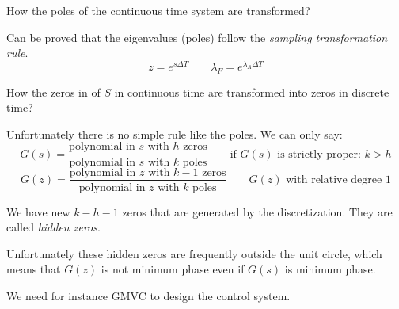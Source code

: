 \begin{remark}
    How the poles of the continuous time system are transformed?

    Can be proved that the eigenvalues (poles) follow the \emph{sampling transformation rule}.
    \[
        z = e^{s\Delta T} \qquad \lambda_F = e^{\lambda_A \Delta T}
    \]

    \begin{figure}[H]
        \centering
    \end{figure}

    How the zeros in of $S$ in continuous time are transformed into zeros in discrete time?

    Unfortunately there is no simple rule like the poles. We can only say:
    \[
        G(s) = \frac{\text{polynomial in $s$ with $h$ zeros}}{\text{polynomial in $s$ with $k$ poles}} \qquad \text{if $G(s)$ is strictly proper: } k > h
    \]
    \[
        G(z) = \frac{\text{polynomial in $z$ with $k-1$ zeros}}{\text{polynomial in $z$ with $k$ poles}} \qquad \text{$G(z)$ with relative degree 1}
    \]

    We have new $k-h-1$ zeros that are generated by the discretization.
    They are called \emph{hidden zeros}.

    Unfortunately these hidden zeros are frequently outside the unit circle, which means that $G(z)$ is not minimum phase even if $G(s)$ is minimum phase.

    We need for instance GMVC to design the control system.
\end{remark}

